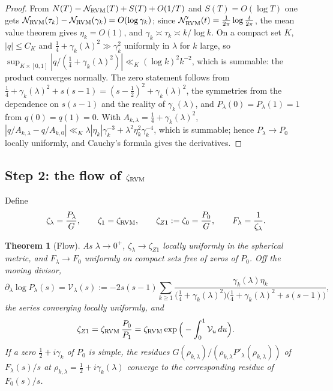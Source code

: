 \documentclass[11pt,reqno]{amsart}
\numberwithin{equation}{section}
\theoremstyle{plain}
\newtheorem{theorem}{Theorem}[section]
\theoremstyle{definition}
\theoremstyle{remark}
\theoremstyle{plain}
\begin{document}
\begin{proof}
From $N(T)=\mathcal N_{\rm RVM}(T)+S(T)+O(1/T)$ and $S(T)=O(\log T)$ one
gets $\mathcal N_{\rm RVM}(\tau_k)-\mathcal N_{\rm RVM}(\gamma_k)=O(\log\gamma_k)$;
since $\mathcal N'_{\rm RVM}(t)=\frac1{2\pi}\log\frac t{2\pi}$, the mean value
theorem gives $\eta_k=O(1)$, and $\gamma_k\asymp\tau_k\asymp k/\log k$.  On a
compact set $K$, $|q|\le C_K$ and $\tfrac14+\gamma_k(\lambda)^2\gg\gamma_k^2$
uniformly in $\lambda$ for $k$ large, so
$\sup_{K\times[0,1]}|q/(\tfrac14+\gamma_k(\lambda)^2)|\ll_K(\log k)^2k^{-2}$,
which is summable: the product converges normally.  The zero statement
follows from
$\tfrac14+\gamma_k(\lambda)^2+s(s-1)=(s-\tfrac12)^2+\gamma_k(\lambda)^2$, the
symmetries from the dependence on $s(s-1)$ and the reality of
$\gamma_k(\lambda)$, and $P_\lambda(0)=P_\lambda(1)=1$ from $q(0)=q(1)=0$.
With $A_{k,\lambda}=\tfrac14+\gamma_k(\lambda)^2$,
$|q/A_{k,\lambda}-q/A_{k,0}|\ll_K\lambda|\eta_k|\gamma_k^{-3}+\lambda^2\eta_k^2\gamma_k^{-4}$,
which is summable; hence $P_\lambda\to P_0$ locally uniformly, and Cauchy's
formula gives the derivatives.
\end{proof}

\subsection{Step 2: the flow of $\zeta_{\rm RVM}$}

Define
\begin{equation}\label{eq:BM-zeta-lambda}
\zeta_\lambda=\frac{P_\lambda}{G},\qquad \zeta_1=\zeta_{\rm RVM},\qquad
\zeta_{Z1}:=\zeta_0=\frac{P_0}{G},\qquad F_\lambda=\frac1{\zeta_\lambda}.
\end{equation}

\begin{theorem}[Flow]\label{thm:BM-flow}
As $\lambda\to0^+$, $\zeta_\lambda\to\zeta_{Z1}$ locally uniformly in the
spherical metric, and $F_\lambda\to F_0$ uniformly on compact sets free of
zeros of $P_0$.  Off the moving divisor,
\begin{equation}\label{eq:BM-generator}
\partial_\lambda\log P_\lambda(s)=\mathcal V_\lambda(s):=
-2s(s-1)\sum_{k\ge1}\frac{\gamma_k(\lambda)\eta_k}
{\big(\tfrac14+\gamma_k(\lambda)^2\big)\big(\tfrac14+\gamma_k(\lambda)^2+s(s-1)\big)},
\end{equation}
the series converging locally uniformly, and
\begin{equation}\label{eq:BM-integrated}
\zeta_{Z1}=\zeta_{\rm RVM}\,\frac{P_0}{P_1}
=\zeta_{\rm RVM}\exp\Big(-\int_0^1\mathcal V_u\,du\Big).
\end{equation}
If a zero $\tfrac12+i\gamma_k$ of $P_0$ is simple, the residues
$G(\rho_{k,\lambda})/(\rho_{k,\lambda}P'_\lambda(\rho_{k,\lambda}))$ of
$F_\lambda(s)/s$ at $\rho_{k,\lambda}=\tfrac12+i\gamma_k(\lambda)$ converge to
the corresponding residue of $F_0(s)/s$.
\end{theorem}
\end{document}
